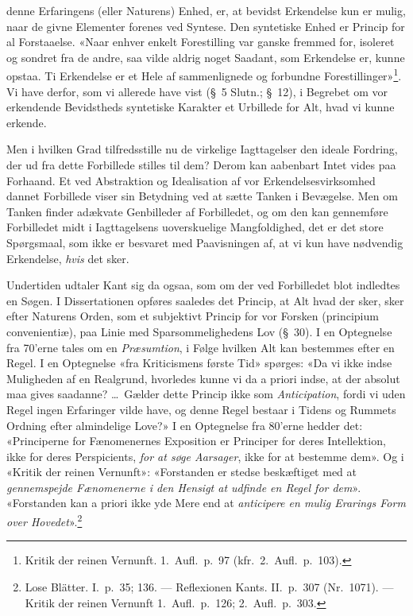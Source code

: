 \documentclass[12pt,a4paper]{article}
\newcommand{\apage}[1]{\marginnote{\footnotesize\textit{[#1]}}}
\begin{document}
denne Erfaringens (eller Naturens) Enhed, er, at bevidst Erkendelse kun
er mulig, naar de givne Elementer forenes ved Syntese. Den syntetiske
Enhed er Princip for al Forstaaelse. «Naar enhver enkelt Forestilling var
ganske fremmed for, isoleret og sondret fra de andre, saa vilde aldrig
noget Saadant, som Erkendelse er, kunne opstaa. Ti Erkendelse er et Hele
af sammenlignede og forbundne Forestillinger»\footnote{Kritik der
reinen Vernunft. 1.\ Aufl.\ p.\ 97 (kfr.\ 2.\ Aufl.\ p.\ 103).}. Vi
have derfor, \apage{32} som vi allerede have vist (§\ 5 Slutn.; §\ 12), i Begrebet
om vor erkendende Bevidstheds syntetiske Karakter et Urbillede for Alt,
hvad vi kunne erkende.

Men i hvilken Grad tilfredsstille nu de virkelige Iagttagelser den ideale
Fordring, der ud fra dette Forbillede stilles til dem? Derom kan
aabenbart Intet vides paa Forhaand. Et ved Abstraktion og Idealisation af
vor Erkendelsesvirksomhed dannet Forbillede viser sin Betydning ved at
sætte Tanken i Bevægelse. Men om Tanken finder adækvate Genbilleder af
Forbilledet, og om den kan gennemføre Forbilledet midt i Iagttagelsens
uoverskuelige Mangfoldighed, det er det store Spørgsmaal, som ikke er
besvaret med Paavisningen af, at vi kun have nødvendig Erkendelse, \emph{hvis}
det sker.

Undertiden udtaler Kant sig da ogsaa, som om der ved Forbilledet blot
indledtes en Søgen. I Dissertationen opføres saaledes det Princip, at Alt
hvad der sker, sker efter Naturens Orden, som et subjektivt Princip for
vor Forsken (principium convenientiæ), paa Linie med
Sparsommelighedens Lov (§\ 30). I en Optegnelse fra 70'erne tales om en
\emph{Præsumtion}, i Følge hvilken Alt kan bestemmes efter en Regel. I en
Optegnelse «fra Kriticismens første Tid» spørges: «Da vi ikke indse
Muligheden af en Realgrund, hvorledes kunne vi da a priori indse, at der
absolut maa gives saadanne? \ldots\ Gælder dette Princip ikke som
\emph{Anticipation}, fordi vi uden Regel ingen Erfaringer vilde have, og denne
Regel bestaar i Tidens og Rummets Ordning efter almindelige Love?» I en
Optegnelse fra 80'erne hedder det: «Principerne for Fænomenernes
Exposition er Principer for deres Intellektion, ikke for deres
Perspicients, \emph{for at søge Aarsager}, ikke for at bestemme dem». Og i
«Kritik der reinen Vernunft»: «Forstanden er stedse beskæftiget med at
\emph{gennemspejde Fænomenerne i den Hensigt at udfinde en Regel for dem}».
«Forstanden kan a priori ikke yde Mere end at \emph{anticipere en mulig
Erarings Form over Hovedet}».\footnote{Lose Blätter. I.\ p.\ 35;
136. --- Reflexionen Kants. II.\ p.\ 307 (Nr.\ 1071). ---
Kritik der reinen Vernunft 1.\ Aufl.\ p.\ 126; 2.\ Aufl.\ p.\
303.}
\end{document}
